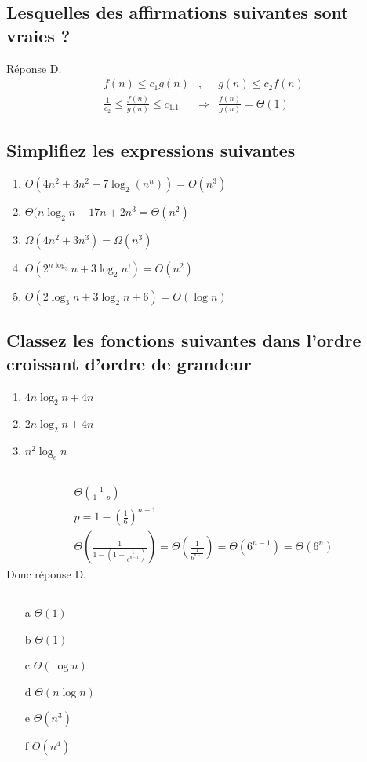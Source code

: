\subsection{Lesquelles des affirmations suivantes sont vraies ?}
Réponse D. 
\begin{eqnarray*}
	f(n) \leq c_1 g(n)&,& g(n) \leq c_2 f(n)\\
	\frac{1}{c_2} \leq \frac{f(n)}{g(n)} \leq c_1.1 &\Rightarrow& \frac{f(n)}{g(n)} = \Theta(1)
\end{eqnarray*}
\subsection{Simplifiez les expressions suivantes}
\begin{enumerate}
	\item $O(4n^2+3n^2+7\log_2(n^n)) = O(n^3)$ 
	\item $\Theta(n\log_2 n + 17n + 2n^3 = \Theta (n^2)$ 
	\item $\Omega(4n^2 + 3n^3) = \Omega(n^3)$ 
	\item $O(2^{n\log_3}n + 3\log_2 n!) = O(n^2)$
	\item $O(2\log_3 n + 3\log_2 n + 6) = O(\log n)$
\end{enumerate}
\subsection{Classez les fonctions suivantes dans l'ordre croissant d'ordre de grandeur}
\begin{enumerate}
\item $4n \log_2 n + 4n$
\item $2n \log_2 n + 4n$
\item $n^2 \log_e n$
\end{enumerate}

\subsection{}
\begin{eqnarray*}
	\Theta(\frac{1}{1-p})\\
	p = 1 - (\frac{1}{6})^{n-1}\\
	\Theta(\frac{1}{1-(1-\frac{1}{6^{n-1}})}) = \Theta(\frac{1}{\frac{1}{6^{n-1}}}) = \Theta(6^{n-1}) = \Theta(6^n)
\end{eqnarray*}
Donc réponse D.
\subsection{}
\begin{enumerate}
	\item[a]$\Theta(1)$
	\item[b] $\Theta(1)$
	\item[c] $\Theta(\log n)$
	\item[d] $\Theta(n\log n)$
	\item[e] $\Theta(n^3)$
	\item[f] $\Theta(n^4)$
\end{enumerate}

\subsection{}
\subsection{}
